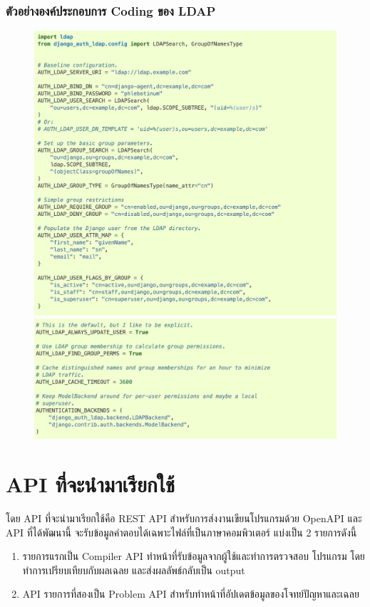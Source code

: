 \subsubsection{ตัวอย่างองค์ประกอบการ Coding ของ LDAP}
\begin{figure}[!thb]
\captionsetup{justification=centering}
\centering
\includegraphics[width=6in]{figures/exam1}
\includegraphics[width=6in]{figures/exam2}
\label{figure:exam}
\end{figure}
\newpage

\section{API ที่จะนำมาเรียกใช้}
\cite{restapi}
โดย API ที่จะนำมาเรียกใช้คือ REST API สําหรับการส่งงานเขียนโปรแกรมด้วย OpenAPI และ API ที่ได้พัฒนานี้ จะรับข้อมูลคําตอบได้เฉพาะไฟล์ที่เป็นภาษาคอมพิวเตอร์ แบ่งเป็น 2 รายการดังนี้
\begin{enumerate}
    \item รายการแรกเป็น Compiler API ทําหน้าที่รับข้อมูลจากผู้ใช้และทําการตรวจสอบ
โปรแกรม โดยทําการเปรียบเทียบกับผลเฉลย และส่งผลลัพธ์กลับเป็น output
    \item API รายการที่สองเป็น Problem API สําหรับทําหน้าที่อัปเดตข้อมูลของโจทย์ปัญหาและเฉลย
\end{enumerate}


